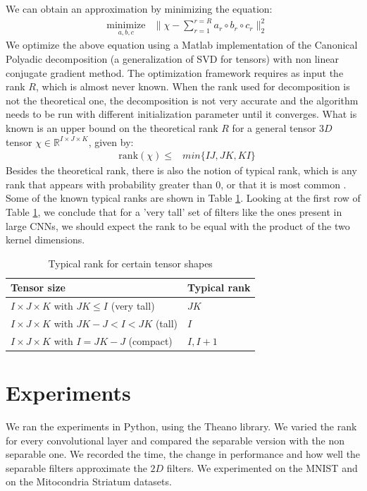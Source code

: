 \documentclass{article} %
\begin{document}
We can obtain an approximation by minimizing the equation:
\begin{equation*}
\begin{aligned}
& \underset{a,b,c}{\text{minimize}}
& \| \chi - \sum_{r=1}^{r=R}{a_{r}\circ b_{r}\circ c_{r}} \|_{2}^{2} 
\end{aligned}
\end{equation*}
We optimize the above equation using a Matlab implementation of the Canonical Polyadic decomposition (a generalization of  SVD for tensors) with  non linear conjugate gradient method. The optimization framework requires as input the rank $R$, which is almost never known. When the rank used for decomposition is not the theoretical one, the decomposition is not very accurate and the algorithm needs to be run with different initialization parameter until it converges.
What is known is an upper bound on the theoretical rank $R$ for a  general tensor $3D$ tensor $\chi \in \mathbb{R}^{I\times J\times K}$, given by:
 \begin{equation*}
\begin{aligned}
& \text{rank}(\chi) \leq 
& min{\{IJ, JK, KI\}}
\end{aligned}
\end{equation*} 
Besides the theoretical rank, there is also the notion of typical rank, which is any rank
that appears with probability greater than 0, or that it is most common \cite{KoBa09}.
Some of the known typical ranks are shown in Table \ref{table:rank}.
Looking at the first row of Table \ref{table:rank}, we conclude that for a 'very tall' set of filters like the ones present in large CNNs, 
we should expect the rank to be equal with the product of the two kernel dimensions.
 \begin{table}
\centering
\begin{tabular}{@{}ll@{}}\toprule
Tensor size & Typical rank \\ \midrule
$I \times J \times K$ with $JK \leq I$ (very tall) & $JK$\\
$I \times J \times K$ with $JK - J < I < JK$ (tall) & $I$ \\
$I \times J \times K$ with $I = JK - J$ (compact) & $I, I+1$  \\ \bottomrule
\end{tabular}
\caption{Typical rank for certain tensor shapes}
\label{table:rank}
\end{table}

\section{Experiments}
We ran the experiments in Python, using the Theano library. 
We varied the rank for every convolutional layer and compared the separable version with the non separable one. We recorded the time, the change in performance and how well the separable filters approximate the $2D$ filters. We experimented on the MNIST and on the Mitocondria Striatum datasets.
\end{document}
